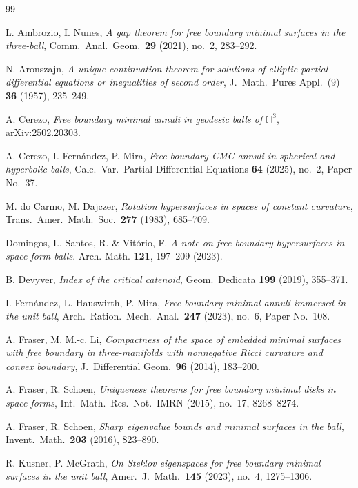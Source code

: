 \documentclass[10pt,a4paper]{amsart}
\newcommand{\Hyp}{\mathbb{H}}
\begin{document}
\begin{thebibliography}{99}

 L. Ambrozio, I. Nunes, \emph{A gap theorem for free boundary minimal surfaces in the three-ball}, Comm.\ Anal.\ Geom.\ \textbf{29} (2021), no.\ 2, 283--292.

 N. Aronszajn, \emph{A unique continuation theorem for solutions of elliptic partial differential equations or inequalities of second order}, J.\ Math.\ Pures Appl.\ (9) \textbf{36} (1957), 235--249.

 A. Cerezo, \emph{Free boundary minimal annuli in geodesic balls of $\Hyp^3$}, arXiv:2502.20303.

 A. Cerezo, I. Fern\'andez, P. Mira, \emph{Free boundary CMC annuli in spherical and hyperbolic balls}, Calc.\ Var.\ Partial Differential Equations \textbf{64} (2025), no.\ 2, Paper No.\ 37.

 M. do Carmo, M. Dajczer, \emph{Rotation hypersurfaces in spaces of constant curvature}, Trans.\ Amer.\ Math.\ Soc.\ \textbf{277} (1983), 685--709.

 Domingos, I., Santos, R. \& Vitório, F. \emph{A note on free boundary hypersurfaces in space form balls}. Arch. Math. \textbf{121}, 197–209 (2023). 

 B. Devyver, \emph{Index of the critical catenoid}, Geom.\ Dedicata \textbf{199} (2019), 355--371.

 I. Fern\'andez, L. Hauswirth, P. Mira, \emph{Free boundary minimal annuli immersed in the unit ball}, Arch.\ Ration.\ Mech.\ Anal.\ \textbf{247} (2023), no.\ 6, Paper No.\ 108.

 A. Fraser, M. M.-c. Li, \emph{Compactness of the space of embedded minimal surfaces with free boundary in three-manifolds with nonnegative Ricci curvature and convex boundary}, J.\ Differential Geom.\ \textbf{96} (2014), 183--200.

 A. Fraser, R. Schoen, \emph{Uniqueness theorems for free boundary minimal disks in space forms}, Int.\ Math.\ Res.\ Not.\ IMRN (2015), no.\ 17, 8268--8274.

 A. Fraser, R. Schoen, \emph{Sharp eigenvalue bounds and minimal surfaces in the ball}, Invent.\ Math.\ \textbf{203} (2016), 823--890.

 R. Kusner, P. McGrath, \emph{On Steklov eigenspaces for free boundary minimal surfaces in the unit ball}, Amer.\ J.\ Math.\ \textbf{145} (2023), no.\ 4, 1275--1306.


\end{thebibliography}
\end{document}
